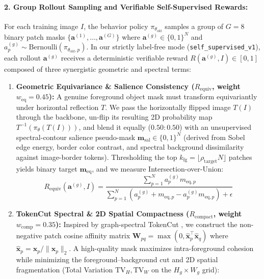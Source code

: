 \documentclass[11pt,a4paper]{article}
\begin{document}
\paragraph{2. Group Rollout Sampling and Verifiable Self-Supervised Rewards:}
For each training image $I$, the behavior policy $\pi_{\theta_{\text{old}}}$ samples a group of $G = 8$ binary patch masks $\{\mathbf{a}^{(1)}, \dots, \mathbf{a}^{(G)}\}$ where $\mathbf{a}^{(g)} \in \{0, 1\}^N$ and $a_p^{(g)} \sim \text{Bernoulli}(\pi_{\theta_{\text{old}}, p})$. In our strictly label-free mode (\texttt{self\_supervised\_v1}), each rollout $\mathbf{a}^{(g)}$ receives a deterministic verifiable reward $R(\mathbf{a}^{(g)}, I) \in [0, 1]$ composed of three synergistic geometric and spectral terms:
\begin{enumerate}[leftmargin=*]
    \item \textbf{Geometric Equivariance \& Salience Consistency ($R_{\text{equiv}}$, weight $w_{\text{eq}} = 0.45$):} A genuine foreground object mask must transform equivariantly under horizontal reflection $T$. We pass the horizontally flipped image $T(I)$ through the backbone, un-flip its resulting 2D probability map $T^{-1}(\pi_\theta(T(I)))$, and blend it equally ($0.50 : 0.50$) with an unsupervised spectral-contour salience pseudo-mask $\mathbf{m}_{\text{sal}} \in \{0, 1\}^N$ (derived from Sobel edge energy, border color contrast, and spectral background dissimilarity against image-border tokens). Thresholding the top $k_{\text{fg}} = \lfloor \rho_{\text{target}} N \rfloor$ patches yields binary target $\mathbf{m}_{\text{eq}}$, and we measure Intersection-over-Union:
    \begin{equation}
    R_{\text{equiv}}(\mathbf{a}^{(g)}, I) = \frac{\sum_{p=1}^N a_p^{(g)} m_{\text{eq}, p}}{\sum_{p=1}^N \left(a_p^{(g)} + m_{\text{eq}, p} - a_p^{(g)} m_{\text{eq}, p}\right) + \epsilon}
    \label{eq:reward_equiv}
    \end{equation}
    \item \textbf{TokenCut Spectral \& 2D Spatial Compactness ($R_{\text{compact}}$, weight $w_{\text{comp}} = 0.35$):} Inspired by graph-spectral TokenCut \cite{wang2022tokencut}, we construct the non-negative patch cosine affinity matrix $\mathbf{W}_{pq} = \max(0, \hat{\mathbf{x}}_p^\top \hat{\mathbf{x}}_q)$ where $\hat{\mathbf{x}}_p = \mathbf{x}_p / \|\mathbf{x}_p\|_2$. A high-quality mask maximizes intra-foreground cohesion while minimizing the foreground--background cut and 2D spatial fragmentation (Total Variation $\text{TV}_H, \text{TV}_W$ on the $H_g \times W_g$ grid):

\end{enumerate}
\end{document}
